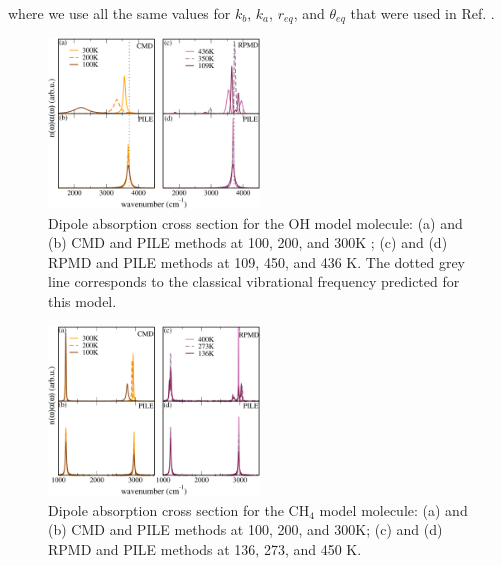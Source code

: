 \documentclass[aps,prb,superscriptaddress,amsmath,amssymb,showpacs,twocolumn]{revtex4}
\begin{document}
\noindent where we use all the same values for $k_b$, $k_a$, $r_{eq}$, and $\theta_{eq}$ that were used in Ref. \cite{witt+09jcp}.

\begin{figure}[htbp]
\centering
\includegraphics[width=0.5\textwidth]{figures/comparison_oh_factors.pdf}
\caption{Dipole absorption cross section for the OH model molecule: (a) and (b) CMD and PILE methods at 100, 200, and 300K ; (c)  and (d) RPMD and PILE methods at 109, 450, and 436 K. The dotted grey line corresponds to the classical vibrational frequency predicted for this model.}
\label{fig:oh-rpmd-cmd-pile}
\end{figure}

\begin{figure}[htbp]
\centering
\includegraphics[width=0.5\textwidth]{figures/comparison_ch4_factors.pdf}
\caption{Dipole absorption cross section for the CH$_4$ model molecule: (a) and (b) CMD and PILE methods at 100, 200, and 300K; (c) and (d) RPMD and PILE methods at 136, 273, and 450 K.}
\label{fig:ch4-rpmd-cmd-pile}
\end{figure}
\end{document}
